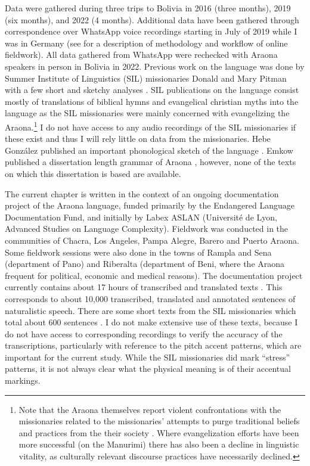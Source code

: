 \documentclass[output=paper,hidelinks]{langscibook}
\begin{document}
Data were gathered during three trips to Bolivia in 2016 (three months), 2019 (six months), and 2022 (4 months). Additional data have been gathered through correspondence over WhatsApp voice recordings starting in July of 2019 while I was in Germany (see \citet{Neelyforthcoming} for a description of methodology and workflow of online fieldwork). All data gathered from WhatsApp were rechecked with Araona speakers in person in Bolivia in 2022. Previous work on the language was done by Summer Institute of Linguistics (SIL) missionaries Donald and Mary Pitman with a few short and sketchy analyses \citep{pitmanpitman1976, pitman:1980:araonasketch, pitmanmary:diccionario:1981, pitmanpitman:1970:jerarquia}. SIL publications on the language consist mostly of translations of biblical hymns and evangelical christian myths into the language as the SIL missionaries were mainly concerned with evangelizing the Araona.\footnote{Note that the Araona themselves report violent confrontations with the missionaries related to the missionaries' attempts to purge traditional beliefs and practices from the their society \citep{tallmanaraonadocumentation:2021}. Where evangelization efforts have been more successful (on the Manurimi) there has also been a decline in linguistic vitality, as culturally relevant discourse practices have necessarily declined.} I do not have access to any audio recordings of the SIL missionaries if these exist and thus I will rely little on data from the missionaries. Hebe González published an important phonological sketch of the language \citep{gonzález:1997:araona}. Emkow published a dissertation length grammar of Araona \citep{emkow:2006:araona, emkow:2019:araonarepublish}, however, none of the texts on which this dissertation is based are available.

The current chapter is written in the context of an ongoing documentation project of the Araona language, funded primarily by the Endangered Language Documentation Fund, and initially by Labex ASLAN (Université de Lyon, Advanced Studies on Language Complexity). Fieldwork was conducted in the communities of Chacra, Los Angeles, Pampa Alegre, Barero and Puerto Araona. Some fieldwork sessions were also done in the towns of Rampla and Sena (department of Pano) and Riberalta (department of Beni, where the Araona frequent for political, economic and medical reasons). The documentation project currently contains about 17 hours of transcribed and translated texts \citep{tallmanaraonadocumentation:2021}. This corresponds to about 10,000 transcribed, translated and annotated sentences of naturalistic speech. There are some short texts from the SIL missionaries which total about 600 sentences \citep{pitmanpitman:1980:banihistoria}. I do not make extensive use of these texts, because I do not have access to corresponding recordings to verify the accuracy of the transcriptions, particularly with reference to the pitch accent patterns, which are important for the current study. While the SIL missionaries did mark ``stress'' patterns, it is not always clear what the physical meaning is of their accentual markings.
\end{document}
